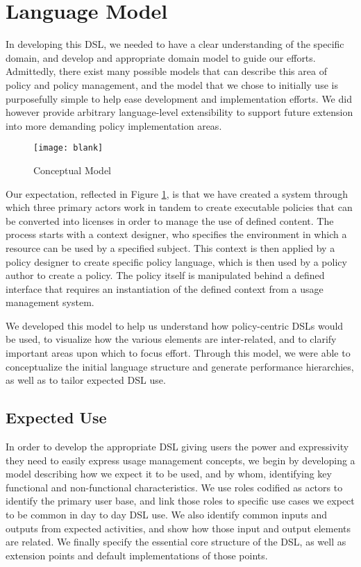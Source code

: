\section{Language Model}\label{sec:model}
In developing this DSL, we needed to have a clear understanding of the specific domain, and develop and appropriate domain model to guide our efforts.  Admittedly, there exist many possible models that can describe this area of policy and policy management, and the model that we chose to initially use is purposefully simple to help ease development and implementation efforts.  We did however provide arbitrary language-level extensibility to support future extension into more demanding policy implementation areas.

\begin{figure}[!t]
\centering
\texttt{[image: blank]}
\caption{Conceptual Model}
\label{fig:model:conceptual-model}
\end{figure}

Our expectation, reflected in Figure \ref{fig:model:conceptual-model}, is that we have created a system through which three primary actors work in tandem to create executable policies that can be converted into licenses in order to manage the use of defined content.  The process starts with a context designer, who specifies the environment in which a resource can be used by a specified subject.  This context is then applied by a policy designer to create specific policy language, which is then used by a policy author to create a policy.  The policy itself is manipulated behind a defined interface that requires an instantiation of the defined context from a usage management system.

We developed this model to help us understand how policy-centric DSLs would be used, to visualize how the various elements are inter-related, and to clarify important areas upon which to focus effort.  Through this model, we were able to conceptualize the initial language structure and generate performance hierarchies, as well as to tailor expected DSL use.

\subsection{Expected Use}
In order to develop the appropriate DSL giving users the power and expressivity they need to easily express usage management concepts, we begin by developing a model describing how we expect it to be used, and by whom, identifying key functional and non-functional characteristics.  We use roles codified as actors to identify the primary user base, and link those roles to specific use cases we expect to be common in day to day DSL use.  We also identify common inputs and outputs from expected activities, and show how those input and output elements are related.  We finally specify the essential core structure of the DSL, as well as extension points and default implementations of those points.

